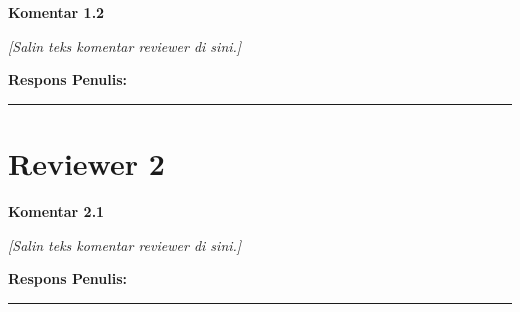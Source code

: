 \documentclass[12pt,a4paper]{article}
\begin{document}
\noindent\textbf{Komentar 1.2}
\begin{mdframed}[style=reviewerbox]
  \textit{[Salin teks komentar reviewer di sini.]}
\end{mdframed}

\noindent\textbf{Respons Penulis:}
\begin{mdframed}[style=authorbox]
\end{mdframed}


\bigskip
\hrule
\bigskip

\section*{Reviewer 2}

\noindent\textbf{Komentar 2.1}
\begin{mdframed}[style=reviewerbox]
  \textit{[Salin teks komentar reviewer di sini.]}
\end{mdframed}

\noindent\textbf{Respons Penulis:}
\begin{mdframed}[style=authorbox]
\end{mdframed}


\bigskip
\hrule
\bigskip

\end{document}
